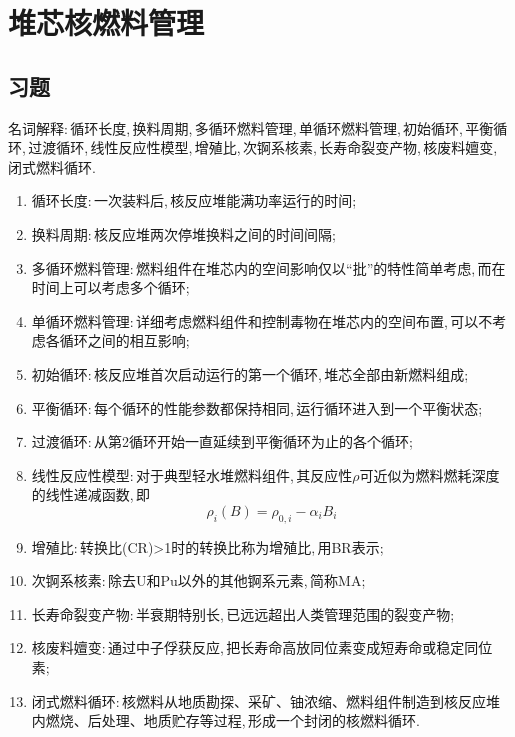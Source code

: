 \chapter{堆芯核燃料管理}
\section*{习题}

\begin{exercise}
    名词解释:\,循环长度,\,换料周期,\,多循环燃料管理,\,单循环燃料管理,\,初始循环,\,平衡循环,\,过渡循环,\,线性反应性模型,\,增殖比,\,次锕系核素,\,长寿命裂变产物,\,核废料嬗变,\,闭式燃料循环.\,
    \begin{solution}
        \begin{enumerate}[(1)]
            \item 循环长度:\,一次装料后,\,核反应堆能满功率运行的时间;\,
            \item 换料周期:\,核反应堆两次停堆换料之间的时间间隔;\,
            \item 多循环燃料管理:\,燃料组件在堆芯内的空间影响仅以“批”的特性简单考虑,\,而在时间上可以考虑多个循环;\,
            \item 单循环燃料管理:\,详细考虑燃料组件和控制毒物在堆芯内的空间布置,\,可以不考虑各循环之间的相互影响;\,
            \item 初始循环:\,核反应堆首次启动运行的第一个循环,\,堆芯全部由新燃料组成;\,
            \item 平衡循环:\,每个循环的性能参数都保持相同,\,运行循环进入到一个平衡状态;\,
            \item 过渡循环:\,从第2循环开始一直延续到平衡循环为止的各个循环;\,
            \item 线性反应性模型:\,对于典型轻水堆燃料组件,\,其反应性$\rho$可近似为燃料燃耗深度的线性递减函数,\,即
            \begin{equation*}
                \rho_i(B) = \rho_{0,i} - \alpha_i B_i
            \end{equation*}
            \item 增殖比:\,转换比(CR)>1时的转换比称为增殖比,\,用BR表示;\,
            \item 次锕系核素:\,除去U和Pu以外的其他锕系元素,\,简称MA;\,
            \item 长寿命裂变产物:\,半衰期特别长,\,已远远超出人类管理范围的裂变产物;\,
            \item 核废料嬗变:\,通过中子俘获反应,\,把长寿命高放同位素变成短寿命或稳定同位素;\,
            \item 闭式燃料循环:\,核燃料从地质勘探、采矿、铀浓缩、燃料组件制造到核反应堆内燃烧、后处理、地质贮存等过程,\,形成一个封闭的核燃料循环.\,
        \end{enumerate}
    \end{solution}
\end{exercise}


